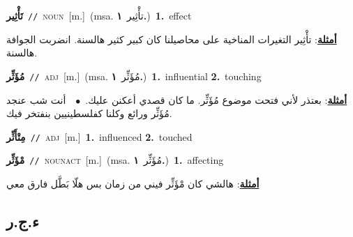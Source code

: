 \documentclass[10pt,a4paper,twoside]{article} %
\begin{document}
\begin{multicols}{2}
{\setlength\topsep{0pt}\textbf{\foreignlanguage{arabic}{تَأْثِير}}\ {\color{gray}\texttt{//}\color{black}}\ \textsc{noun}\ [m.]\ \color{gray}(msa. \foreignlanguage{arabic}{تأْثِير}~\foreignlanguage{arabic}{\textbf{١.}})\color{black}\ \textbf{1.}~effect\  \begin{flushright}\color{gray}\foreignlanguage{arabic}{\textbf{\underline{\foreignlanguage{arabic}{أمثلة}}}: تأْثِير التغيرات المناخية على محاصيلنا كان كبير كثير هالسنة. انضربت الجوافة هالسنة.}\end{flushright}\color{black}} \vspace{2mm}

{\setlength\topsep{0pt}\textbf{\foreignlanguage{arabic}{مُؤَثِّر}}\ {\color{gray}\texttt{//}\color{black}}\ \textsc{adj}\ [m.]\ \color{gray}(msa. \foreignlanguage{arabic}{مُؤَثِّر}~\foreignlanguage{arabic}{\textbf{١.}})\color{black}\ \textbf{1.}~influential  \textbf{2.}~touching\  \begin{flushright}\color{gray}\foreignlanguage{arabic}{\textbf{\underline{\foreignlanguage{arabic}{أمثلة}}}: بعتذر لأني فتحت موضوع مُؤَثِّر. ما كان قصدي أعكنن عليك.\ $\bullet$\ \  أنت شب عنجد مُؤَثِّر ورائع وكلنا كفلسطينيين بنفتخر فيك.}\end{flushright}\color{black}} \vspace{2mm}

{\setlength\topsep{0pt}\textbf{\foreignlanguage{arabic}{مِتْأَثِّر}}\ {\color{gray}\texttt{//}\color{black}}\ \textsc{adj}\ [m.]\ \textbf{1.}~influenced  \textbf{2.}~touched\ } \vspace{2mm}

{\setlength\topsep{0pt}\textbf{\foreignlanguage{arabic}{مْؤَثِّر}}\ {\color{gray}\texttt{//}\color{black}}\ \textsc{noun\textunderscore act}\ [m.]\ \color{gray}(msa. \foreignlanguage{arabic}{مُؤَثِّر}~\foreignlanguage{arabic}{\textbf{١.}})\color{black}\ \textbf{1.}~affecting\  \begin{flushright}\color{gray}\foreignlanguage{arabic}{\textbf{\underline{\foreignlanguage{arabic}{أمثلة}}}: هالشي كان مْؤَثِّر فيني من زمان بس هلّا بَطَّل فارق معي}\end{flushright}\color{black}} \vspace{2mm}

\vspace{-3mm}
\subsection*{\color{blue}\foreignlanguage{arabic}{ء.ج.ر}\color{blue}{}} 


\end{multicols}
\end{document}
